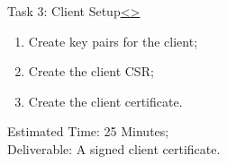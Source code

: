 \documentclass[12pt]{extarticle}
\newenvironment{instructionblock}{\Large\bgroup}{\egroup}
\newcommand{\ben}{\begin{enumerate}}
\newcommand{\een}{\end{enumerate}}
\begin{document}

\pagebreak
\begin{slide}{Task 3: Client Setup}{\hyperref[slide 9]{\textless}\hyperref[slide 11]{\textgreater}}
	\begin{instructionblock}
		\ben
			\item Create key pairs for the client;
			\item Create the client CSR;
			\item Create the client certificate.
		\een
	\end{instructionblock}
\end{slide} 
\noindent
Estimated Time: 25 Minutes; \\
Deliverable: A signed client certificate.\\

\vspace*{5mm}
\end{document}
